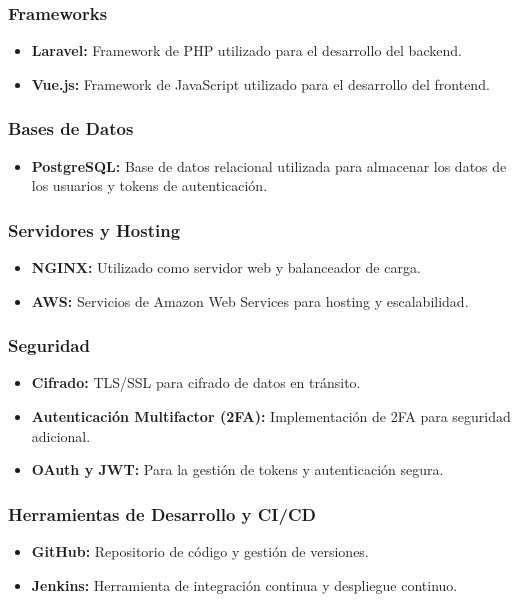 \documentclass{article}
\begin{document}
\subsubsection{Frameworks}
\begin{itemize}
    \item \textbf{Laravel:} Framework de PHP utilizado para el desarrollo del backend.
    \item \textbf{Vue.js:} Framework de JavaScript utilizado para el desarrollo del frontend.
\end{itemize}

\subsubsection{Bases de Datos}
\begin{itemize}
    \item \textbf{PostgreSQL:} Base de datos relacional utilizada para almacenar los datos de los usuarios y tokens de autenticación.
\end{itemize}

\subsubsection{Servidores y Hosting}
\begin{itemize}
    \item \textbf{NGINX:} Utilizado como servidor web y balanceador de carga.
    \item \textbf{AWS:} Servicios de Amazon Web Services para hosting y escalabilidad.
\end{itemize}

\subsubsection{Seguridad}
\begin{itemize}
    \item \textbf{Cifrado:} TLS/SSL para cifrado de datos en tránsito.
    \item \textbf{Autenticación Multifactor (2FA):} Implementación de 2FA para seguridad adicional.
    \item \textbf{OAuth y JWT:} Para la gestión de tokens y autenticación segura.
\end{itemize}

\subsubsection{Herramientas de Desarrollo y CI/CD}
\begin{itemize}
    \item \textbf{GitHub:} Repositorio de código y gestión de versiones.
    \item \textbf{Jenkins:} Herramienta de integración continua y despliegue continuo.
\end{itemize}
\end{document}
